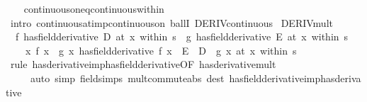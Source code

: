 \begin{isabellebody}
%
\isadelimproof
\ \ %
\endisadelimproof
%
\isatagproof
{}\isamarkupfalse%
\ continuous{\isacharunderscore}{\kern0pt}on{\isacharunderscore}{\kern0pt}eq{\isacharunderscore}{\kern0pt}continuous{\isacharunderscore}{\kern0pt}within\isanewline
\ \ \isamarkupfalse%
\ {\isacharparenleft}{\kern0pt}intro\ continuous{\isacharunderscore}{\kern0pt}at{\isacharunderscore}{\kern0pt}imp{\isacharunderscore}{\kern0pt}continuous{\isacharunderscore}{\kern0pt}on\ ballI\ DERIV{\isacharunderscore}{\kern0pt}continuous{\isacharparenright}{\kern0pt}%
\endisatagproof
{\isafoldproof}%
%
\isadelimproof
\isanewline
%
\endisadelimproof
\isanewline
{}\isamarkupfalse%
\ DERIV{\isacharunderscore}{\kern0pt}mult{\isacharprime}{\kern0pt}{\isacharcolon}{\kern0pt}\isanewline
\ \ {\isachardoublequoteopen}{\isacharparenleft}{\kern0pt}f\ has{\isacharunderscore}{\kern0pt}field{\isacharunderscore}{\kern0pt}derivative\ D{\isacharparenright}{\kern0pt}\ {\isacharparenleft}{\kern0pt}at\ x\ within\ s{\isacharparenright}{\kern0pt}\ {\isasymLongrightarrow}\ {\isacharparenleft}{\kern0pt}g\ has{\isacharunderscore}{\kern0pt}field{\isacharunderscore}{\kern0pt}derivative\ E{\isacharparenright}{\kern0pt}\ {\isacharparenleft}{\kern0pt}at\ x\ within\ s{\isacharparenright}{\kern0pt}\ {\isasymLongrightarrow}\isanewline
\ \ \ \ {\isacharparenleft}{\kern0pt}{\isacharparenleft}{\kern0pt}{\isasymlambda}x{\isachardot}{\kern0pt}\ f\ x\ {\isacharasterisk}{\kern0pt}\ g\ x{\isacharparenright}{\kern0pt}\ has{\isacharunderscore}{\kern0pt}field{\isacharunderscore}{\kern0pt}derivative\ f\ x\ {\isacharasterisk}{\kern0pt}\ E\ {\isacharplus}{\kern0pt}\ D\ {\isacharasterisk}{\kern0pt}\ g\ x{\isacharparenright}{\kern0pt}\ {\isacharparenleft}{\kern0pt}at\ x\ within\ s{\isacharparenright}{\kern0pt}{\isachardoublequoteclose}\isanewline
%
\isadelimproof
\ \ %
\endisadelimproof
%
\isatagproof
{}\isamarkupfalse%
\ {\isacharparenleft}{\kern0pt}rule\ has{\isacharunderscore}{\kern0pt}derivative{\isacharunderscore}{\kern0pt}imp{\isacharunderscore}{\kern0pt}has{\isacharunderscore}{\kern0pt}field{\isacharunderscore}{\kern0pt}derivative{\isacharbrackleft}{\kern0pt}OF\ has{\isacharunderscore}{\kern0pt}derivative{\isacharunderscore}{\kern0pt}mult{\isacharbrackright}{\kern0pt}{\isacharparenright}{\kern0pt}\isanewline
\ \ \ \ \ {\isacharparenleft}{\kern0pt}auto\ simp{\isacharcolon}{\kern0pt}\ field{\isacharunderscore}{\kern0pt}simps\ mult{\isacharunderscore}{\kern0pt}commute{\isacharunderscore}{\kern0pt}abs\ dest{\isacharcolon}{\kern0pt}\ has{\isacharunderscore}{\kern0pt}field{\isacharunderscore}{\kern0pt}derivative{\isacharunderscore}{\kern0pt}imp{\isacharunderscore}{\kern0pt}has{\isacharunderscore}{\kern0pt}derivative{\isacharparenright}{\kern0pt}%

\end{isabellebody}
